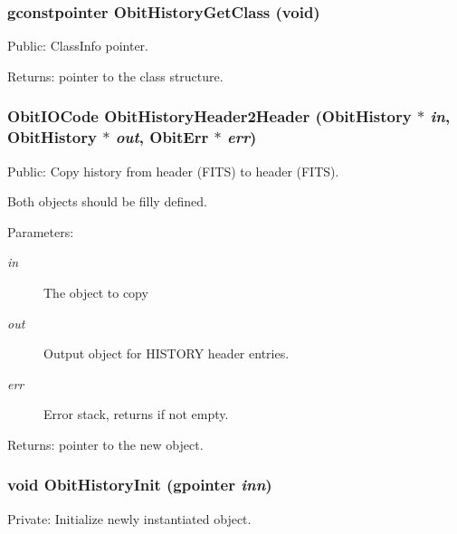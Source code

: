 \subsubsection{\setlength{\rightskip}{0pt plus 5cm}gconstpointer Obit\-History\-Get\-Class (void)}\label{ObitHistory_8c_a9}


Public: Class\-Info pointer. 

\begin{Desc}
\item[Returns:]pointer to the class structure. \end{Desc}
\subsubsection{\setlength{\rightskip}{0pt plus 5cm}Obit\-IOCode Obit\-History\-Header2Header ({\bf Obit\-History} $\ast$ {\em in}, {\bf Obit\-History} $\ast$ {\em out}, {\bf Obit\-Err} $\ast$ {\em err})}\label{ObitHistory_8c_a14}


Public: Copy history from header (FITS) to header (FITS). 

Both objects should be filly defined. \begin{Desc}
\item[Parameters:]
\begin{description}
\item[{\em in}]The object to copy \item[{\em out}]Output object for HISTORY header entries. \item[{\em err}]Error stack, returns if not empty. \end{description}
\end{Desc}
\begin{Desc}
\item[Returns:]pointer to the new object. \end{Desc}
\subsubsection{\setlength{\rightskip}{0pt plus 5cm}void Obit\-History\-Init (gpointer {\em inn})}\label{ObitHistory_8c_a3}


Private: Initialize newly instantiated object. 

